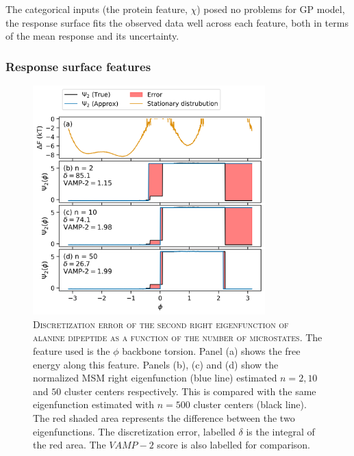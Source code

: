 The categorical inputs (the protein feature, $\chi$) posed no problems for GP model, the response surface fits the observed data well across each feature, both in terms of the mean response and its uncertainty. 

\subsubsection{Response surface features}

\begin{figure}
    \centering
    \includegraphics[width=0.8\textwidth]{chapters/msm_optimization/figures/ala1_ev_n_compare.png}
    \caption[Discretization error of the second right eigenfunction of alanine dipeptide as a function of the number of microstates]{\textsc{Discretization error of the second right eigenfunction of alanine dipeptide as a function of the number of microstates}. The feature used is the $\phi$ backbone torsion. Panel (a) shows the free energy along this feature. Panels (b), (c) and (d) show the normalized MSM right eigenfunction (blue line) estimated $n=2, 10$ and $50$ cluster centers respectively. This is compared with the same eigenfunction estimated with $n=500$ cluster centers (black line). The red shaded area represents the difference between the two eigenfunctions. The discretization error, labelled $\delta$ is the integral of the red area. The $VAMP-2$ score is also labelled for comparison.}
    \label{fig:ala1_evcompare}
\end{figure}

